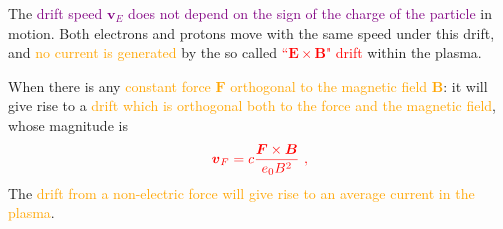 \documentclass[12pt,a4paper]{article}
\renewcommand{\vec}[1]{\boldsymbol{#1}}
\begin{document}
The \textcolor{purple}{drift speed $\vec{v}_E$ does not depend on the sign of the charge of the particle} in motion. Both electrons and protons move with the same speed under this drift, and \textcolor{orange}{no current is generated} by the so called \textcolor{red}{``$\vec{E} \times \vec{B}$" drift} within the plasma. 


When there is any \textcolor{orange}{constant force $\vec{F}$ orthogonal to the magnetic field $\vec{B}$}: it will give rise to a \textcolor{orange}{drift which is orthogonal both to the force and the magnetic field}, whose magnitude is 
\begin{equation}
\color{red} \vec{v}_F = c \frac{\vec{F} \times \vec{B}}{e_0 B^2} ~,
\end{equation}
The \textcolor{orange}{drift from a non-electric force will give rise to an average current in the plasma}.   
\end{document}
